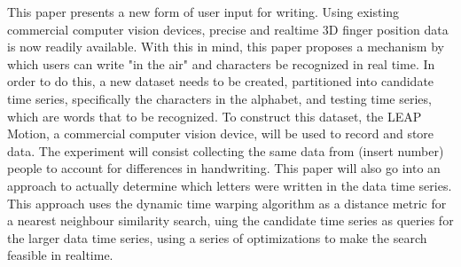 This paper presents a new form of user input for writing. Using existing commercial computer vision devices, precise and realtime 3D finger position data is now readily available. With this in mind, this paper proposes a mechanism by which users can write "in the air" and characters be recognized in real time. In order to do this, a new dataset needs to be created, partitioned into candidate time series, specifically the characters in the alphabet, and testing time series, which are words that to be recognized. To construct this dataset, the LEAP Motion, a commercial computer vision device, will be used to record and store data. The experiment will consist collecting the same data from  (insert number) people to account for differences in handwriting. This paper will also go into an approach to actually determine which letters were written in the data time series. This approach uses the dynamic time warping algorithm as a distance metric for a nearest neighbour similarity search, uing the candidate time series as queries for the larger data time series, using a series of optimizations to make the search feasible in realtime.
